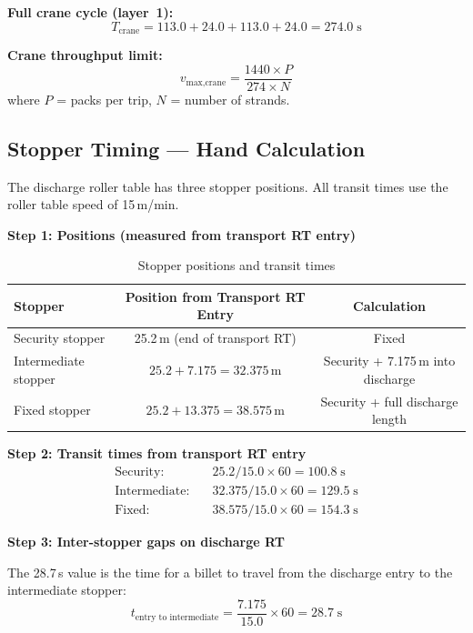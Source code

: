 \documentclass[11pt,a4paper]{article}
\begin{document}
\textbf{Full crane cycle (layer~1):}
\begin{equation}
\boxed{T_\text{crane} = 113.0 + 24.0 + 113.0 + 24.0 = 274.0\;\text{s}}
\end{equation}

\textbf{Crane throughput limit:}
\begin{equation}
v_\text{max,crane} = \frac{1440 \times P}{274 \times N}
\end{equation}
where $P$ = packs per trip, $N$ = number of strands.

\subsection{Stopper Timing --- Hand Calculation}
\label{sec:stopper-timing}

The discharge roller table has three stopper positions. All transit times use the roller table speed of 15\,m/min.

\textbf{Step 1: Positions (measured from transport RT entry)}

\begin{table}[H]
\centering
\caption{Stopper positions and transit times}
\label{tab:stoppers}
\begin{tabular}{@{}lcc@{}}
\toprule
Stopper & Position from Transport RT Entry & Calculation \\
\midrule
Security stopper & 25.2\,m (end of transport RT) & Fixed \\
Intermediate stopper & $25.2 + 7.175 = 32.375$\,m & Security + 7.175\,m into discharge \\
Fixed stopper & $25.2 + 13.375 = 38.575$\,m & Security + full discharge length \\
\bottomrule
\end{tabular}
\end{table}

\textbf{Step 2: Transit times from transport RT entry}
\begin{align}
\text{Security:}\quad & 25.2 / 15.0 \times 60 = 100.8\;\text{s} \\
\text{Intermediate:}\quad & 32.375 / 15.0 \times 60 = 129.5\;\text{s} \\
\text{Fixed:}\quad & 38.575 / 15.0 \times 60 = 154.3\;\text{s}
\end{align}

\textbf{Step 3: Inter-stopper gaps on discharge RT}

The 28.7\,s value is the time for a billet to travel from the discharge entry to the intermediate stopper:
\begin{equation}
t_\text{entry to intermediate} = \frac{7.175}{15.0} \times 60 = 28.7\;\text{s}
\end{equation}
\end{document}
